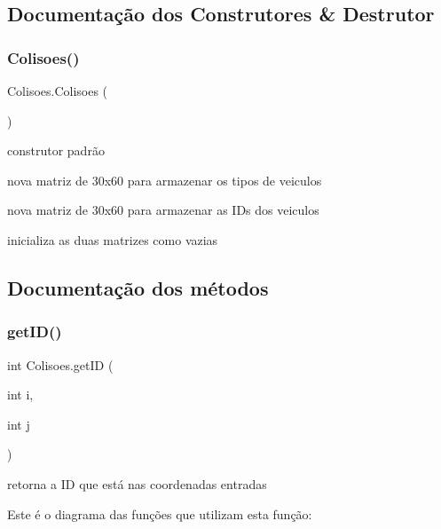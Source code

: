 \subsection{Documentação dos Construtores \& Destrutor}
\mbox{\label{class_colisoes_a8a51b610e7e5d3a011b5c790429dc598}} 
\subsubsection{\texorpdfstring{Colisoes()}{Colisoes()}}
{\footnotesize\ttfamily Colisoes.\+Colisoes (\begin{DoxyParamCaption}{ }\end{DoxyParamCaption})}



construtor padrão 

nova matriz de 30x60 para armazenar os tipos de veiculos

nova matriz de 30x60 para armazenar as I\+Ds dos veiculos

inicializa as duas matrizes como vazias 

\subsection{Documentação dos métodos}
\mbox{\label{class_colisoes_a2a5dc91b1a181819919be8726272293a}} 
\subsubsection{\texorpdfstring{get\+I\+D()}{getID()}}
{\footnotesize\ttfamily int Colisoes.\+get\+ID (\begin{DoxyParamCaption}\item[{int}]{i,  }\item[{int}]{j }\end{DoxyParamCaption})}



retorna a ID que está nas coordenadas entradas 

Este é o diagrama das funções que utilizam esta função\+:
\mbox{\label{class_colisoes_a12b4feebe3aceaf64b6a20941677d31f}} 
